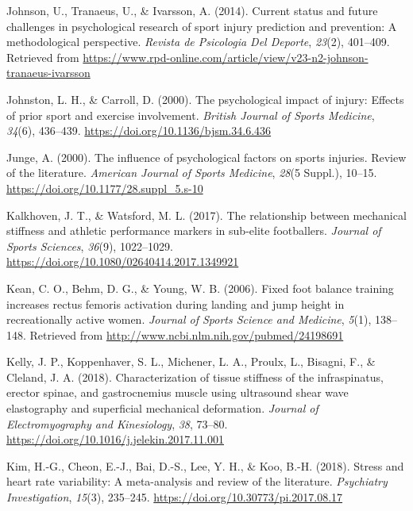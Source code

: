 \documentclass[
  english,
  man,floatsintext]{apa6}
\begin{document}
\leavevmode\hypertarget{ref-Johnson2014}{}%
Johnson, U., Tranaeus, U., \& Ivarsson, A. (2014). Current status and future challenges in psychological research of sport injury prediction and prevention: A methodological perspective. \emph{Revista de Psicologia Del Deporte}, \emph{23}(2), 401--409. Retrieved from \url{https://www.rpd-online.com/article/view/v23-n2-johnson-tranaeus-ivarsson}

\leavevmode\hypertarget{ref-Johnston2000}{}%
Johnston, L. H., \& Carroll, D. (2000). The psychological impact of injury: Effects of prior sport and exercise involvement. \emph{British Journal of Sports Medicine}, \emph{34}(6), 436--439. \url{https://doi.org/10.1136/bjsm.34.6.436}

\leavevmode\hypertarget{ref-Junge2000}{}%
Junge, A. (2000). The influence of psychological factors on sports injuries. Review of the literature. \emph{American Journal of Sports Medicine}, \emph{28}(5 Suppl.), 10--15. \url{https://doi.org/10.1177/28.suppl_5.s-10}

\leavevmode\hypertarget{ref-Kalkhoven2018}{}%
Kalkhoven, J. T., \& Watsford, M. L. (2017). The relationship between mechanical stiffness and athletic performance markers in sub-elite footballers. \emph{Journal of Sports Sciences}, \emph{36}(9), 1022--1029. \url{https://doi.org/10.1080/02640414.2017.1349921}

\leavevmode\hypertarget{ref-Kean2006}{}%
Kean, C. O., Behm, D. G., \& Young, W. B. (2006). Fixed foot balance training increases rectus femoris activation during landing and jump height in recreationally active women. \emph{Journal of Sports Science and Medicine}, \emph{5}(1), 138--148. Retrieved from \url{http://www.ncbi.nlm.nih.gov/pubmed/24198691}

\leavevmode\hypertarget{ref-Kelly2018}{}%
Kelly, J. P., Koppenhaver, S. L., Michener, L. A., Proulx, L., Bisagni, F., \& Cleland, J. A. (2018). Characterization of tissue stiffness of the infraspinatus, erector spinae, and gastrocnemius muscle using ultrasound shear wave elastography and superficial mechanical deformation. \emph{Journal of Electromyography and Kinesiology}, \emph{38}, 73--80. \url{https://doi.org/10.1016/j.jelekin.2017.11.001}

\leavevmode\hypertarget{ref-Kim2018}{}%
Kim, H.-G., Cheon, E.-J., Bai, D.-S., Lee, Y. H., \& Koo, B.-H. (2018). Stress and heart rate variability: A meta-analysis and review of the literature. \emph{Psychiatry Investigation}, \emph{15}(3), 235--245. \url{https://doi.org/10.30773/pi.2017.08.17}
\end{document}
